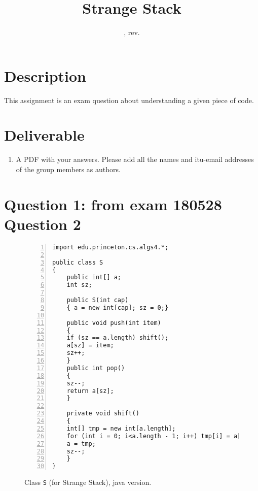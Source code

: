 \documentclass{tufte-handout}
\title{Strange Stack}
\author{}
\date{\GITAuthorDate, rev. \GITAbrHash}
\begin{document}
\maketitle

\section{\textbf{Description}}
This assignment is an exam question about understanding a given piece of code.

\section{\textbf{Deliverable}}
\begin{enumerate}
\item A PDF with your answers.
    Please add all the names and itu-email addresses of the group members as authors.
\end{enumerate}


\section{\textbf{Question 1}: from exam 180528 Question 2}
  \begin{figure}
    
    \begin{lstlisting}[basicstyle=\ttfamily,backgroundcolor=\color{white},
      frame=single,rulecolor=\color{gray!20},framesep=10pt,
      linewidth=12cm,numbers= left]
import edu.princeton.cs.algs4.*;

public class S
{
    public int[] a;
    int sz;

    public S(int cap)
    { a = new int[cap]; sz = 0;}

    public void push(int item)
    {
	if (sz == a.length) shift();
	a[sz] = item;
	sz++;
    }
    public int pop()
    {   
	sz--;
	return a[sz];
    }

    private void shift()
    {
	int[] tmp = new int[a.length];
	for (int i = 0; i<a.length - 1; i++) tmp[i] = a[i+1];
	a = tmp;
	sz--;
    }
}
    \end{lstlisting}
    \caption{\label{fig: S-java} Class {\tt S} (for Strange Stack), java version.}
  \end{figure}
\end{document}
